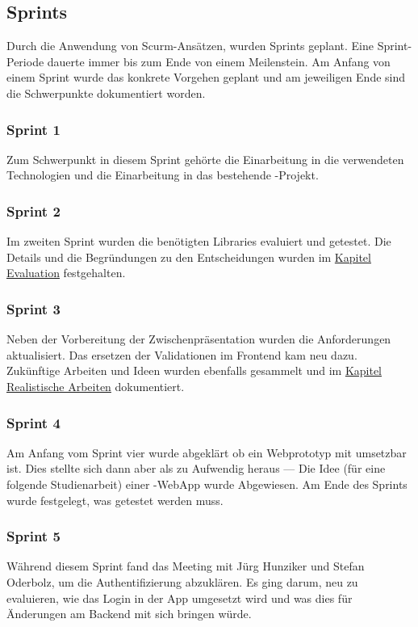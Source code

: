 \subsection{Sprints}
Durch die Anwendung von Scurm-Ansätzen, wurden Sprints geplant. 
Eine Sprint-Periode dauerte immer bis zum Ende von einem Meilenstein. 
Am Anfang von einem Sprint wurde das konkrete Vorgehen geplant und am jeweiligen Ende sind die Schwerpunkte dokumentiert worden.

\subsubsection{Sprint 1}
Zum Schwerpunkt in diesem Sprint gehörte die Einarbeitung in die verwendeten Technologien und die Einarbeitung in das bestehende \kort{}-Projekt.


\subsubsection{Sprint 2}
Im zweiten Sprint wurden die benötigten Libraries evaluiert und getestet.
Die Details und die Begründungen zu den Entscheidungen wurden im \hyperref[tb-evaluation]{Kapitel Evaluation} festgehalten.


\subsubsection{Sprint 3}
Neben der Vorbereitung der Zwischenpräsentation wurden die Anforderungen aktualisiert. 
Das ersetzen der Validationen im Frontend kam neu dazu. 
Zukünftige Arbeiten und Ideen wurden ebenfalls gesammelt und im \hyperref[pd-weiterentwicklung-realistisch]{Kapitel Realistische Arbeiten} dokumentiert.


\subsubsection{Sprint 4}
Am Anfang vom Sprint vier wurde abgeklärt ob ein Webprototyp mit  umsetzbar ist. 
Dies stellte sich dann aber als zu Aufwendig heraus --- Die Idee (für eine folgende Studienarbeit) einer -\gls{WebApp} wurde Abgewiesen.
Am Ende des Sprints wurde festgelegt, was getestet werden muss.

\subsubsection{Sprint 5}
Während diesem Sprint fand das Meeting mit Jürg Hunziker und Stefan Oderbolz, um die Authentifizierung abzuklären. 
Es ging darum, neu zu evaluieren, wie das Login in der App umgesetzt wird und was dies für Änderungen am Backend mit sich bringen würde. 


